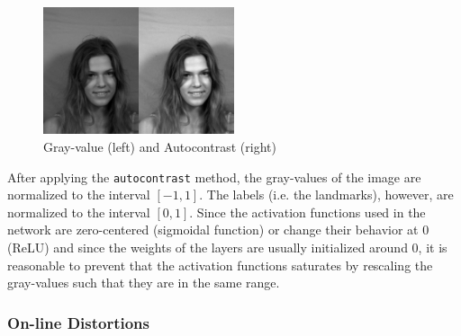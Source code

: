 \documentclass[11pt, a4paper]{article}
\begin{document}
\begin{figure}[htbp]
	\centering
	\includegraphics[width=0.5\textwidth]{gray_autocontrast.png}
	\caption{Gray-value (left) and Autocontrast (right)}
	\label{fig:autocontrast}
\end{figure}

After applying the \texttt{autocontrast} method, the gray-values of the image are normalized to the interval $[-1,1]$. The labels (i.e. the landmarks), however, are normalized to the interval $[0,1]$. Since the activation functions used in the network are zero-centered (sigmoidal function) or change their behavior at 0 (\ac{ReLU}) and since the weights of the layers are usually initialized around 0, it is reasonable to prevent that the activation functions saturates by rescaling the gray-values such that they are in the same range.\\

\subsubsection{On-line Distortions}
\end{document}

